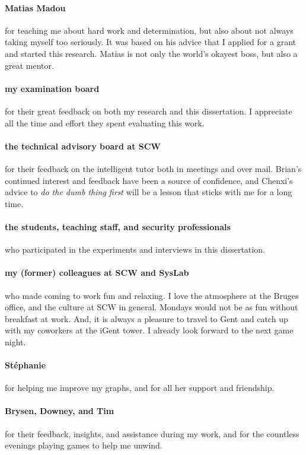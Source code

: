 \paragraph{Matias Madou}
for teaching me about hard work and determination, but also about not always taking myself too seriously.
It was based on his advice that I applied for a grant and started this research.
Matias is not only the world's okayest boss, but also a great mentor.

\paragraph{my examination board}
for their great feedback on both my research and this dissertation.
I appreciate all the time and effort they spent evaluating this work.

\paragraph{the technical advisory board at SCW}
for their feedback on the intelligent tutor both in meetings and over mail.
Brian's continued interest and feedback have been a source of confidence, and Chenxi's advice to \textit{do the dumb thing first} will be a lesson that sticks with me for a long time.

\paragraph{the students, teaching staff, and security professionals}
who participated in the experiments and interviews in this dissertation.

\paragraph{my (former) colleagues at SCW and SysLab}
who made coming to work fun and relaxing.
I love the atmosphere at the Bruges office, and the culture at SCW in general.
Mondays would not be as fun without breakfast at work.
And, it is always a pleasure to travel to Gent and catch up with my coworkers at the iGent tower.
I already look forward to the next game night.

\paragraph{Stéphanie}
for helping me improve my graphs, and for all her support and friendship.

\paragraph{Brysen, Downey, and Tim}
for their feedback, insights, and assistance during my work, and for the countless evenings playing games to help me unwind.


